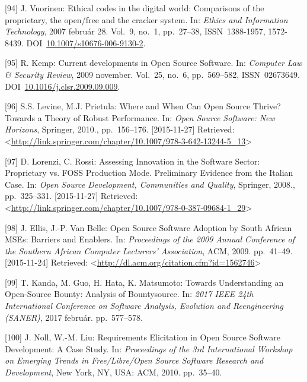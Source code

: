 \documentclass[12pt,magyar,a4paper,oneside]{scrreprt}
\newenvironment{cslreferences}%
  {}%
  {\par}
\begin{document}
\begin{cslreferences}
\leavevmode\hypertarget{ref-vuorinen_ethical_2007}{}%
{[}94{]} J. Vuorinen: Ethical codes in the digital world: Comparisons of
the proprietary, the open/free and the cracker system. In: \emph{Ethics
and Information Technology}, 2007 február 28. Vol.~9, no.~1, pp.~27--38,
ISSN~1388-1957, 1572-8439.
DOI~\href{https://doi.org/10.1007/s10676-006-9130-2}{10.1007/s10676-006-9130-2}.

\leavevmode\hypertarget{ref-kemp_current_2009}{}%
{[}95{]} R. Kemp: Current developments in Open Source Software. In:
\emph{Computer Law \& Security Review}, 2009 november. Vol.~25, no.~6,
pp.~569--582, ISSN~02673649.
DOI~\href{https://doi.org/10.1016/j.clsr.2009.09.009}{10.1016/j.clsr.2009.09.009}.

\leavevmode\hypertarget{ref-levine_where_2010}{}%
{[}96{]} S.S. Levine, M.J. Prietula: Where and When Can Open Source
Thrive? Towards a Theory of Robust Performance. In: \emph{Open Source
Software: New Horizons}, Springer, 2010., pp.~156--176. {[}2015-11-27{]}
Retrieved:
\textless{}\url{http://link.springer.com/chapter/10.1007/978-3-642-13244-5_13}\textgreater{}

\leavevmode\hypertarget{ref-lorenzi_assessing_2008}{}%
{[}97{]} D. Lorenzi, C. Rossi: Assessing Innovation in the Software
Sector: Proprietary vs. FOSS Production Mode. Preliminary Evidence from
the Italian Case. In: \emph{Open Source Development, Communities and
Quality}, Springer, 2008., pp.~325--331. {[}2015-11-27{]} Retrieved:
\textless{}\url{http://link.springer.com/chapter/10.1007/978-0-387-09684-1_29}\textgreater{}

\leavevmode\hypertarget{ref-ellis_open_2009}{}%
{[}98{]} J. Ellis, J.-P. Van Belle: Open Source Software Adoption by
South African MSEs: Barriers and Enablers. In: \emph{Proceedings of the
2009 Annual Conference of the Southern African Computer Lecturers'
Association}, ACM, 2009. pp.~41--49. {[}2015-11-24{]} Retrieved:
\textless{}\url{http://dl.acm.org/citation.cfm?id=1562746}\textgreater{}

\leavevmode\hypertarget{ref-kanda_towards_2017}{}%
{[}99{]} T. Kanda, M. Guo, H. Hata, K. Matsumoto: Towards Understanding
an Open-Source Bounty: Analysis of Bountysource. In: \emph{2017 IEEE
24th International Conference on Software Analysis, Evolution and
Reengineering (SANER)}, 2017 február. pp.~577--578.

\leavevmode\hypertarget{ref-noll_requirements_2010}{}%
{[}100{]} J. Noll, W.-M. Liu: Requirements Elicitation in Open Source
Software Development: A Case Study. In: \emph{Proceedings of the 3rd
International Workshop on Emerging Trends in Free/Libre/Open Source
Software Research and Development}, New York, NY, USA: ACM, 2010.
pp.~35--40.


\end{cslreferences}
\end{document}

